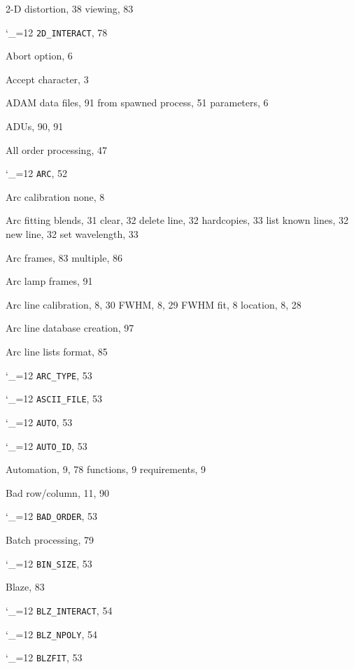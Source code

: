 \documentclass[11pt,twoside]{article}
\newcommand{\cmdname}{\begingroup \catcode`\_=12 \realcmdname}
\newcommand{\realcmdname}[1]{\endgroup\texttt{#1}}
\renewcommand{\printindex}{}
\begin{document}

\begin{theindex}

  \item 2-D distortion, 38
    \subitem viewing, 83
  \item \cmdname {2D_INTERACT}, 78

  \indexspace

  \item Abort
    \subitem option, 6
  \item Accept character, 3
  \item ADAM
    \subitem data files, 91
    \subitem from spawned process, 51
    \subitem parameters, 6
  \item ADUs, 90, 91
  \item All order processing, 47
  \item \cmdname {ARC}, 52
  \item Arc calibration
    \subitem none, 8
  \item Arc fitting
    \subitem blends, 31
    \subitem clear, 32
    \subitem delete line, 32
    \subitem hardcopies, 33
    \subitem list known lines, 32
    \subitem new line, 32
    \subitem set wavelength, 33
  \item Arc frames, 83
    \subitem multiple, 86
  \item Arc lamp frames, 91
  \item Arc line
    \subitem calibration, 8, 30
    \subitem FWHM, 8, 29
    \subitem FWHM fit, 8
    \subitem location, 8, 28
  \item Arc line database creation, 97
  \item Arc line lists
    \subitem format, 85
  \item \cmdname {ARC_TYPE}, 53
  \item \cmdname {ASCII_FILE}, 53
  \item \cmdname {AUTO}, 53
  \item \cmdname {AUTO_ID}, 53
  \item Automation, 9, 78
    \subitem functions, 9
    \subitem requirements, 9

  \indexspace

  \item Bad row/column, 11, 90
  \item \cmdname {BAD_ORDER}, 53
  \item Batch processing, 79
  \item \cmdname {BIN_SIZE}, 53
  \item Blaze, 83
  \item \cmdname {BLZ_INTERACT}, 54
  \item \cmdname {BLZ_NPOLY}, 54
  \item \cmdname {BLZFIT}, 53


\end{theindex}
\end{document}
